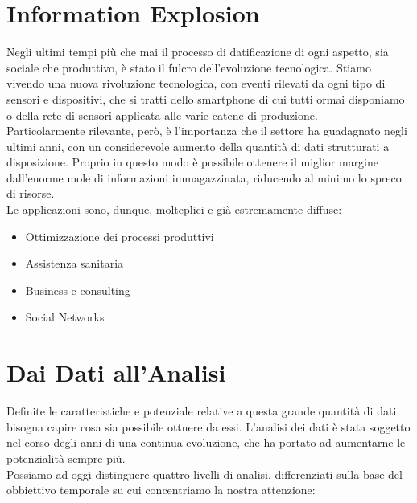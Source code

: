 \section{Information Explosion}
Negli ultimi tempi più che mai il processo di datificazione di ogni aspetto, sia sociale che produttivo, è stato il fulcro dell'evoluzione tecnologica. Stiamo vivendo una nuova rivoluzione tecnologica, con eventi rilevati da ogni tipo di sensori e dispositivi, che si tratti dello smartphone di cui tutti ormai disponiamo o della rete di sensori applicata alle varie catene di produzione.\\
Particolarmente rilevante, però, è l'importanza che il settore ha guadagnato negli ultimi anni, con un considerevole aumento della quantità di dati strutturati a disposizione. Proprio in questo modo è possibile ottenere il miglior margine dall'enorme mole di informazioni immagazzinata, riducendo al minimo lo spreco di risorse.\\
Le applicazioni sono, dunque, molteplici e già estremamente diffuse:
\begin{itemize}
	\item Ottimizzazione dei processi produttivi
	
	\item Assistenza sanitaria
	
	\item Business e consulting
	
	\item Social Networks
\end{itemize}

\section{Dai Dati all'Analisi}
Definite le caratteristiche e potenziale relative a questa grande quantità di dati bisogna capire cosa sia possibile ottnere da essi. L'analisi dei dati è stata soggetto nel corso degli anni di una continua evoluzione, che ha portato ad aumentarne le potenzialità sempre più.\\
Possiamo ad oggi distinguere quattro livelli di analisi, differenziati sulla base del obbiettivo temporale su cui concentriamo la nostra attenzione:

